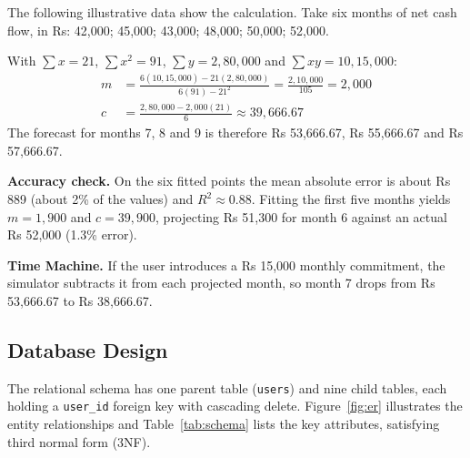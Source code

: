 \documentclass[12pt,a4paper]{report}
\begin{document}
The following illustrative data show the calculation. Take six months of net cash flow, in Rs: 42,000; 45,000; 43,000; 48,000; 50,000; 52,000.

With $\sum x = 21$, $\sum x^2 = 91$, $\sum y = 2{,}80{,}000$ and $\sum xy = 10{,}15{,}000$:
\begin{align*}
m &= \frac{6(10{,}15{,}000) - 21(2{,}80{,}000)}{6(91) - 21^2} = \frac{2{,}10{,}000}{105} = 2{,}000\\
c &= \frac{2{,}80{,}000 - 2{,}000(21)}{6} \approx 39{,}666.67
\end{align*}
The forecast for months 7, 8 and 9 is therefore Rs 53,666.67, Rs 55,666.67 and Rs 57,666.67.

\textbf{Accuracy check.} On the six fitted points the mean absolute error is about Rs 889 (about 2\% of the values) and $R^2 \approx 0.88$. Fitting the first five months yields $m = 1{,}900$ and $c = 39{,}900$, projecting Rs 51,300 for month 6 against an actual Rs 52,000 (1.3\% error).

\textbf{Time Machine.} If the user introduces a Rs 15,000 monthly commitment, the simulator subtracts it from each projected month, so month 7 drops from Rs 53,666.67 to Rs 38,666.67.


\subsection{Database Design}\label{s4222}

The relational schema has one parent table (\texttt{users}) and nine child tables, each holding a \texttt{user\_id} foreign key with cascading delete. Figure~\ref{fig:er} illustrates the entity relationships and Table~\ref{tab:schema} lists the key attributes, satisfying third normal form (3NF).
\end{document}
